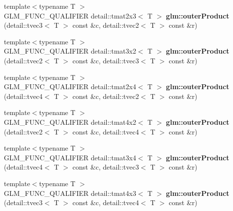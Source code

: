 \begin{DoxyCompactItemize}
\item 
\hypertarget{namespaceglm_a83b1b298cf0e1a51db5eeade5aaf08b1}{{\footnotesize template$<$typename T $>$ }\\\-G\-L\-M\-\_\-\-F\-U\-N\-C\-\_\-\-Q\-U\-A\-L\-I\-F\-I\-E\-R \*
detail\-::tmat2x3$<$ \-T $>$ {\bfseries glm\-::outer\-Product} (detail\-::tvec3$<$ \-T $>$ const \&c, detail\-::tvec2$<$ \-T $>$ const \&r)}\label{namespaceglm_a83b1b298cf0e1a51db5eeade5aaf08b1}

\item 
\hypertarget{namespaceglm_af3835ed91b031947048595312d2bc387}{{\footnotesize template$<$typename T $>$ }\\\-G\-L\-M\-\_\-\-F\-U\-N\-C\-\_\-\-Q\-U\-A\-L\-I\-F\-I\-E\-R \*
detail\-::tmat3x2$<$ \-T $>$ {\bfseries glm\-::outer\-Product} (detail\-::tvec2$<$ \-T $>$ const \&c, detail\-::tvec3$<$ \-T $>$ const \&r)}\label{namespaceglm_af3835ed91b031947048595312d2bc387}

\item 
\hypertarget{namespaceglm_a7c2cdc0bd949ec6907e8c28e22059f01}{{\footnotesize template$<$typename T $>$ }\\\-G\-L\-M\-\_\-\-F\-U\-N\-C\-\_\-\-Q\-U\-A\-L\-I\-F\-I\-E\-R \*
detail\-::tmat2x4$<$ \-T $>$ {\bfseries glm\-::outer\-Product} (detail\-::tvec4$<$ \-T $>$ const \&c, detail\-::tvec2$<$ \-T $>$ const \&r)}\label{namespaceglm_a7c2cdc0bd949ec6907e8c28e22059f01}

\item 
\hypertarget{namespaceglm_a45ad2846226667a7912f3675eadb71f5}{{\footnotesize template$<$typename T $>$ }\\\-G\-L\-M\-\_\-\-F\-U\-N\-C\-\_\-\-Q\-U\-A\-L\-I\-F\-I\-E\-R \*
detail\-::tmat4x2$<$ \-T $>$ {\bfseries glm\-::outer\-Product} (detail\-::tvec2$<$ \-T $>$ const \&c, detail\-::tvec4$<$ \-T $>$ const \&r)}\label{namespaceglm_a45ad2846226667a7912f3675eadb71f5}

\item 
\hypertarget{namespaceglm_a89c4470ff5ee964466f48d7a2810de30}{{\footnotesize template$<$typename T $>$ }\\\-G\-L\-M\-\_\-\-F\-U\-N\-C\-\_\-\-Q\-U\-A\-L\-I\-F\-I\-E\-R \*
detail\-::tmat3x4$<$ \-T $>$ {\bfseries glm\-::outer\-Product} (detail\-::tvec4$<$ \-T $>$ const \&c, detail\-::tvec3$<$ \-T $>$ const \&r)}\label{namespaceglm_a89c4470ff5ee964466f48d7a2810de30}

\item 
\hypertarget{namespaceglm_ae113cac3852e7e6087aa1a275d8d88b8}{{\footnotesize template$<$typename T $>$ }\\\-G\-L\-M\-\_\-\-F\-U\-N\-C\-\_\-\-Q\-U\-A\-L\-I\-F\-I\-E\-R \*
detail\-::tmat4x3$<$ \-T $>$ {\bfseries glm\-::outer\-Product} (detail\-::tvec3$<$ \-T $>$ const \&c, detail\-::tvec4$<$ \-T $>$ const \&r)}\label{namespaceglm_ae113cac3852e7e6087aa1a275d8d88b8}


\end{DoxyCompactItemize}
